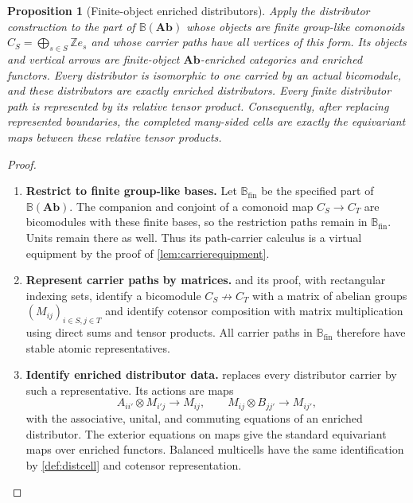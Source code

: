 \documentclass[11pt,reqno]{amsart}
\theoremstyle{plain}
\newtheorem{proposition}[theorem]{Proposition}
\theoremstyle{definition}
\theoremstyle{remark}
\numberwithin{equation}{section}
\newcommand{\harr}{\mathrel{\nrightarrow}}
\newcommand{\Ab}{\mathbf{Ab}}
\begin{document}
\begin{proposition}[Finite-object enriched distributors]\label{prop:Abdistributors}
Apply the distributor construction to the part of $\mathbb B(\Ab)$
whose objects are finite group-like comonoids
$C_S=\bigoplus_{s\in S}\mathbb Z e_s$ and whose carrier paths have
all vertices of this form. Its objects and vertical arrows are
finite-object $\Ab$-enriched categories and enriched functors. Every
distributor is isomorphic to one carried by an actual bicomodule, and
these distributors are exactly enriched distributors. Every finite
distributor path is represented by its relative tensor product.
Consequently, after replacing represented boundaries, the completed
many-sided cells are exactly the equivariant maps between these relative
tensor products.
\end{proposition}
\begin{proof}\leavevmode
\begin{enumerate}
\item \textbf{Restrict to finite group-like bases.} Let $\mathbb B_{\mathrm{fin}}$ be the specified part of
$\mathbb B(\Ab)$. The companion and conjoint of a comonoid map
$C_S\to C_T$ are bicomodules with these finite bases, so the
restriction paths remain in $\mathbb B_{\mathrm{fin}}$. Units remain
there as well. Thus its path-carrier calculus is a virtual equipment
by the proof of \cref{lem:carrierequipment}.

\item \textbf{Represent carrier paths by matrices.}  and its proof, with rectangular indexing sets, identify
a bicomodule $C_S\harr C_T$ with a matrix of abelian groups
$(M_{ij})_{i\in S,j\in T}$ and identify cotensor composition with
matrix multiplication using direct sums and tensor products. All carrier
paths in $\mathbb B_{\mathrm{fin}}$ therefore have stable atomic
representatives.

\item \textbf{Identify enriched distributor data.}  replaces every
distributor carrier by such a representative. Its actions are maps
\[
 A_{ii'}\otimes M_{i'j}\longrightarrow M_{ij},\qquad
 M_{ij}\otimes B_{jj'}\longrightarrow M_{ij'},
\]
with the associative, unital, and commuting equations of an enriched
distributor. The exterior equations on maps give the standard equivariant
maps over enriched functors. Balanced multicells have the same
identification by \cref{def:distcell} and cotensor representation.


\end{enumerate}
\end{proof}
\end{document}
